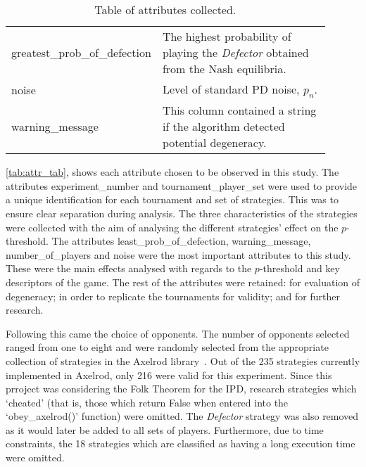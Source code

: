 \begin{table}
\begin{tabular}{>{\raggedright}p{0.3\linewidth}>{\raggedright\arraybackslash}p{0.6\linewidth}}
    greatest\_prob\_of\_defection  & The highest probability of playing the
    \textit{Defector} obtained from the Nash equilibria. \\
    
    noise                       & Level of standard PD noise, \(p_{n}\). \\
                      
    warning\_message             & This column contained a string if the
    algorithm detected potential degeneracy. \\
    \bottomrule
\end{tabular}
\caption{Table of attributes collected.}\label{tab:attr_tab} 
\end{table}

\autoref{tab:attr_tab}, shows each attribute chosen to be observed in this
study. The attributes experiment\_number and tournament\_player\_set were used
to provide a unique identification for each tournament and set of strategies.
This was to ensure clear separation during analysis. The three characteristics of the strategies
were collected with the aim of analysing the different strategies'
effect on the \(p\)-threshold. The attributes least\_prob\_of\_defection,
warning\_message, number\_of\_players and noise were the most important
attributes to this study. These were the main effects analysed with regards to the \(p\)-threshold and key descriptors of the game. The rest of the attributes
were retained: for evaluation of degeneracy; in order to replicate the
tournaments for validity; and for further research.

Following this came the choice of opponents. The number of opponents selected
ranged from one to eight and were randomly selected from the appropriate
collection of strategies in the Axelrod library~\cite{axelrodproject}. Out of
the 235 strategies currently implemented in Axelrod, only 216 were valid for
this experiment. Since this prroject was considering the Folk Theorem for the IPD,
research strategies which `cheated' (that is, those which return False when
entered into the `obey\_axelrod()' function) were omitted. The \textit{Defector} strategy
was also removed as it would later be added to all sets of players. Furthermore,
due to time constraints, the 18 strategies which are classified as having a long
execution time were omitted. 

